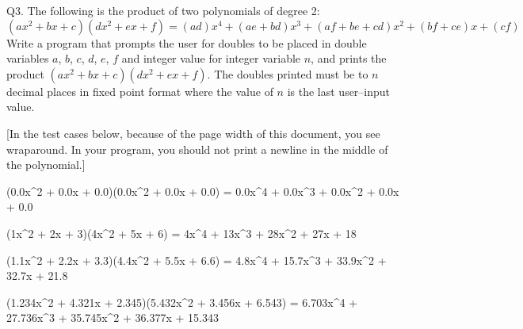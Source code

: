 Q3. The following is the product of two polynomials of degree 2:
\[
(ax^2 + bx + c)(dx^2 + ex + f) = 
(ad)x^4 + (ae + bd)x^3 + (af + be + cd)x^2 + (bf + ce)x + (cf)
\]
Write a program that prompts the user 
for doubles to be placed in double variables 
$a$, $b$, $c$, $d$, $e$, $f$ and
integer value for integer variable $n$, 
and prints the product 
$(ax^2 + bx + c)(dx^2 + ex + f)$. 
The doubles
printed must be to $n$ decimal places in fixed point format where the value of
 $n$ is the last user--input
value.

[In the test cases below, because of the page width of this document, you see wraparound. In your
program, you should not print a newline in the middle of the polynomial.]

\resett
\nextt
\begin{console}[commandchars=\\\{\}]
(0.0x^2 + 0.0x + 0.0)(0.0x^2 + 0.0x + 0.0) = 0.0x^4 + 0.0x^3 + 0.0x^2 + 
0.0x + 0.0
\end{console}

\nextt
\begin{console}[commandchars=\\\{\}]
(1x^2 + 2x + 3)(4x^2 + 5x + 6) = 4x^4 + 13x^3 + 28x^2 + 27x + 18
\end{console}

\nextt
\begin{console}[commandchars=\\\{\}]
(1.1x^2 + 2.2x + 3.3)(4.4x^2 + 5.5x + 6.6) = 4.8x^4 + 15.7x^3 + 33.9x^2 +
32.7x + 21.8
\end{console}

\nextt
\begin{console}[commandchars=\\\{\}]
(1.234x^2 + 4.321x + 2.345)(5.432x^2 + 3.456x + 6.543) = 6.703x^4 +
27.736x^3 + 35.745x^2 + 36.377x + 15.343
\end{console}
